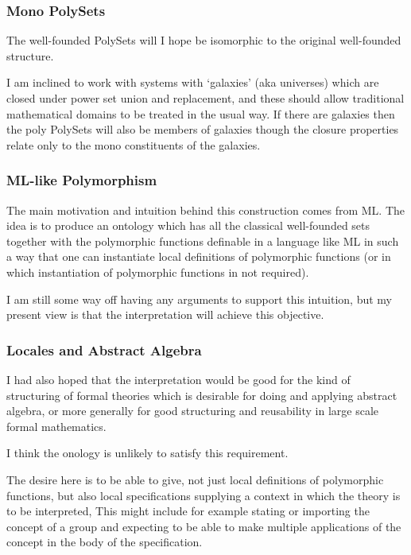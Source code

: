 \documentclass{article}
\begin{document}
\begin{article}
\subsubsection{Mono PolySets}

The well-founded PolySets will I hope be isomorphic to the original well-founded structure.

I am inclined to work with systems with `galaxies' (aka universes) which are closed under power set union and replacement, and these should allow traditional mathematical domains to be treated in the usual way.
If there are galaxies then the poly PolySets will also be members of galaxies though the closure properties relate only to the mono constituents of the galaxies.

\subsubsection{ML-like Polymorphism}

The main motivation and intuition behind this construction comes from ML.
The idea is to produce an ontology which has all the classical well-founded sets together with the polymorphic functions definable in a language like ML in such a way that one can instantiate local definitions of polymorphic functions (or in which instantiation of polymorphic functions in not required).

I am still some way off having any arguments to support this intuition, but my present view is that the interpretation will achieve this objective.

\subsubsection{Locales and Abstract Algebra}

I had also hoped that the interpretation would be good for the kind of structuring of formal theories which is desirable for doing and applying abstract algebra, or more generally for good structuring and reusability in large scale formal mathematics.

I think the onology is unlikely to satisfy this requirement.

The desire here is to be able to give, not just local definitions of polymorphic functions, but also local specifications supplying a context in which the theory is to be interpreted,
This might include for example stating or importing the concept of a group and expecting to be able to make multiple applications of the concept in the body of the specification.


\end{article}
\end{document}
